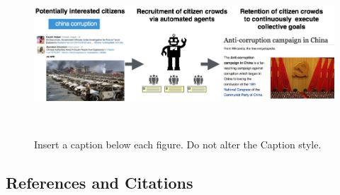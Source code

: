 \documentclass{sigchi}
\begin{document}



\begin{figure}
\centering
  \includegraphics[width=0.9\columnwidth]{citizenWiki.png}
  \caption{Insert a caption below each figure. Do not alter the
    Caption style.}~\label{fig:figure1}
\end{figure}


\subsection{References and Citations}
\end{document}
